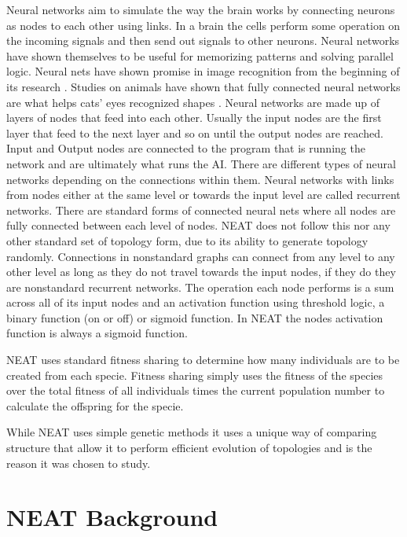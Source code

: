 \documentclass[12pt]{ucthesis} \newif\ifpdf \ifx\pdfoutput\undefined
\begin{document}
Neural networks aim to simulate the way the brain works by connecting neurons as
nodes to each other using links. In a brain the cells perform some operation on
the incoming signals and then send out signals to other neurons.
Neural networks have shown themselves to be useful for memorizing patterns and
solving parallel logic. Neural nets have shown promise in image recognition from
the beginning of its research \cite{lippmann}. Studies on animals have shown
that fully connected neural networks are what helps cats’ eyes recognized shapes
\cite{hubel1959receptive}.
Neural networks are made up of layers of nodes that feed into each other.
Usually the input nodes are the first layer that feed to the next layer and so
on until the output nodes are reached. Input and Output nodes are connected to
the program that is running the network and are ultimately what runs the AI.
There are different types of neural networks depending on the connections within
them. Neural networks with links from nodes either at the same level or towards
the input level are called recurrent networks. There are standard forms of
connected neural nets where all nodes are fully connected between each level of
nodes. NEAT does not follow this nor any other standard set of topology form,
due to its ability to generate topology randomly. Connections in nonstandard
graphs can connect from any level to any other level as long as they do not
travel towards the input nodes, if they do they are nonstandard recurrent
networks.
The operation each node performs is a sum across all of its input nodes and an
activation function using threshold logic, a binary function (on or off) or
sigmoid function. In NEAT the nodes activation function is always a sigmoid
function.

NEAT uses standard fitness sharing to determine how many individuals are to be
created from each specie. Fitness sharing simply uses the fitness of the species
over the total fitness of all individuals times the current population number to
calculate the offspring for the specie.

While NEAT uses simple genetic methods it uses a unique way of comparing
structure that allow it to perform efficient evolution of topologies and is the
reason it was chosen to study.

\section{NEAT Background}
\end{document}
